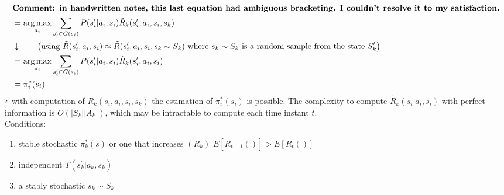 \begin{align*}
& \textbf{Comment: in handwritten notes, this last equation had ambiguous bracketing. I couldn't resolve it to my satisfaction.} \\
& = \argmax_{a_i} \sum_{s_i^\prime \in G( s_i )} P( s^\prime_i | a_i, s_i ) \tilde{R}_k( s_i^\prime, a_i, s_i, s_k ) \\
& \downarrow \qquad \left( \text{using\ } \tilde{R}( s^\prime_i, a_i, s_i ) \approx \tilde{R}( s_i^\prime, a_i, s_i, s_k \sim S_k ) \text{\ where\ }s_k \sim S_k \text{\ is\ a\ random\ sample\ from\ the\ state\ } S_k^\prime \right) \\
& = \argmax_{a_i} \sum_{s_i^\prime \in G( s_i )} P( s^\prime_i | a_i, s_i ) \tilde{R}_k( s_i^\prime, a_i, s_i ) \\
& = \pi^\ast_i( s_i )                              
\end{align*}
$\therefore$ with computation of $\tilde{R}_k( s_i, a_i, s_i, s_k )$ the estimation of $\pi_i^\ast( s_i )$ is possible.  The complexity to compute $\tilde{R}_k( s_i | a_i, s_i )$ with perfect information is $O(|S_k||A_k|)$, which may be intractable to compute each time instant $t$. \\

Conditions:
\begin{enumerate}[label=\arabic*.]
\item stable stochastic $\pi_k^\ast(s)$ or one that increases $(R_k)$ $E[R_{t+1}()]>E[R_t()]$
\item independent $T( s^\prime_k | a_k, s_k )$
\item a stably stochastic $s_k \sim S_k$
\end{enumerate}

